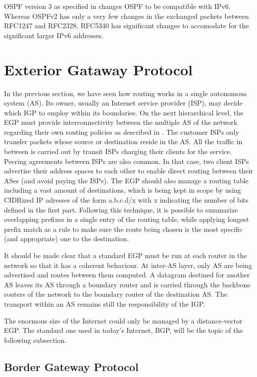 \documentclass{acm_proc_article-sp}
\begin{document}
OSPF version 3 as specified in \cite{RFC5340} changes OSPF to be compatible with IPv6. Whereas OSPFv2 has only a very few changes in the exchanged packets between RFC1247 and RFC2328, RFC5340 has significant changes to accomodate for the significant larger IPv6 addresses.

\section{Exterior Gataway Protocol}

In the previous section, we have seen how routing works in a single autonomous system (AS). Its owner, usually an Internet service provider (ISP), may decide which IGP to employ within its boundaries. On the next hierarchical level, the EGP must provide interconnectivity between the multiple AS of the network regarding their own routing policies as described in \cite{tanenbaum}. The customer ISPs only transfer packets whose source or destination reside in the AS. All the traffic in between is carried out by transit ISPs charging their clients for the service. Peering agreements between ISPs are also common. In that case, two client ISPs advertise their address spaces to each other to enable direct routing between their ASes (and avoid paying the ISPs). The EGP should also manage a routing table including a vast amount of destinations, which is being kept in scope by using CIDRized IP adresses of the form a.b.c.d/x with x indicating the number of bits defined in the first part. Following this technique, it is possible to summarize overlapping prefixes in a single entry of the routing table, while applying longest prefix match as a rule to make sure the route being chosen is the most specific (and appropriate) one to the destination.

It should be made clear that a standard EGP must be run at each router in the network so that it has a coherent behaviour. At inter-AS layer, only AS are being advertised and routes between them computed. A datagram destined for another AS leaves its AS through a boundary router and is carried through the backbone routers of the network to the boundary router of the destination AS. The transport within an AS remains still the responsibility of the IGP.

The enormous size of the Internet could only be managed by a distance-vector EGP. The standard one used in today's Internet, BGP, will be the topic of the following subsection. 

\subsection{Border Gateway Protocol}
\end{document}
